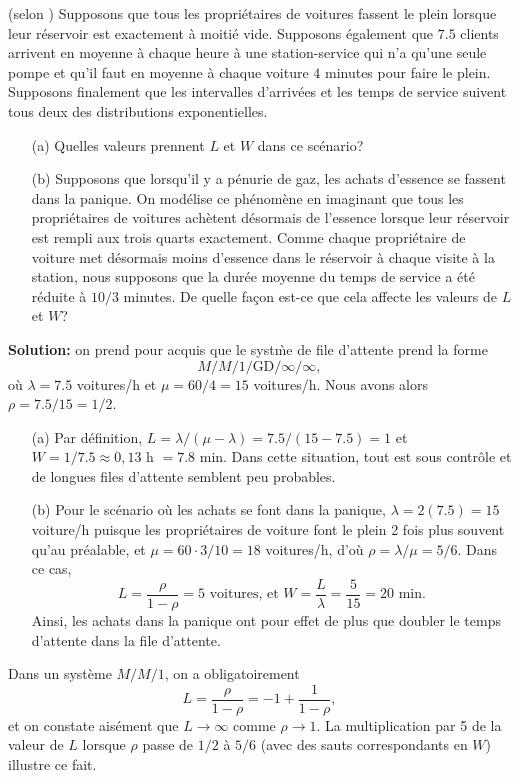 \begin{Exemple} (selon \cite{QS_E}) Supposons que tous les propriétaires de voitures fassent le plein lorsque leur réservoir est exactement à moitié vide. Supposons également que $7.5$ clients arrivent en moyenne à chaque heure à une station-service qui n'a qu'une seule pompe et qu'il faut en moyenne à chaque voiture $4$ minutes pour faire le plein. Supposons finalement que les intervalles d'arrivées et les temps de service suivent tous deux des distributions exponentielles. \begin{itemize}[noitemsep]
	\item[(a)] Quelles valeurs prennent $L$ et $W$ dans ce scénario? 
	\item[(b)] Supposons que lorsqu'il y a pénurie de gaz, les achats d'essence se fassent dans la panique. On modélise ce phénomène en imaginant que tous les propriétaires de voitures achètent désormais de l'essence lorsque leur réservoir est rempli aux trois quarts exactement. Comme chaque propriétaire de voiture met désormais moins d'essence dans le réservoir à chaque visite à la station, nous supposons que la durée moyenne du temps de service  a été réduite à $10/3$ minutes. De quelle fa\c{c}on est-ce que cela affecte les valeurs de $L$ et $W$?
\end{itemize}
\textbf{Solution:} on prend pour acquis que le syst\`me de file d'attente prend la forme $$M/M/1/\textrm{GD}/\infty/\infty,$$ où $\lambda = 7.5$ voitures/h et $\mu = 60/4 = 15$ voitures/h.  Nous avons alors $\rho = 7.5/15 = 1/2$.
\begin{enumerate}[noitemsep]
	\item[(a)] Par définition, $L = \lambda/(\mu - \lambda) = 7.5/(15-7.5) = 1$ et $W = 1/7.5 \approx 0,13$ h $=7.8$ min. Dans cette situation, tout est sous contrôle et de longues files d'attente semblent peu probables.
\item[(b)] Pour le scénario où les achats se font dans la panique,   $\lambda = 2(7.5)=15$ voiture/h puisque les propriétaires de voiture font le plein 2 fois plus souvent qu'au préalable, et $\mu = 60 \cdot 3 /10  = 18$ voitures/h, d'où $\rho = \lambda/\mu = 5/6$. Dans ce cas,   
$$ L = \frac{\rho}{1-\rho} = 5 \text{ voitures, et } W = \frac{L}{\lambda} = \frac{5}{15} = 20 \text{ min}.$$
Ainsi, les achats dans la panique ont pour effet de plus que doubler le temps d'attente dans la file d'attente.
\end{enumerate}
\end{Exemple}
\noindent Dans un système $M/M/1$, on a obligatoirement $$L=\frac{\rho}{1-\rho}=-1+\frac{1}{1-\rho},$$ et on constate aisément que  $L\to\infty$ comme $\rho\to 1$. La multiplication par 5 de la valeur de $L$ lorsque $\rho$ passe de $1/2$ à $5/6$ (avec des sauts correspondants en $W$) illustre ce fait. 
